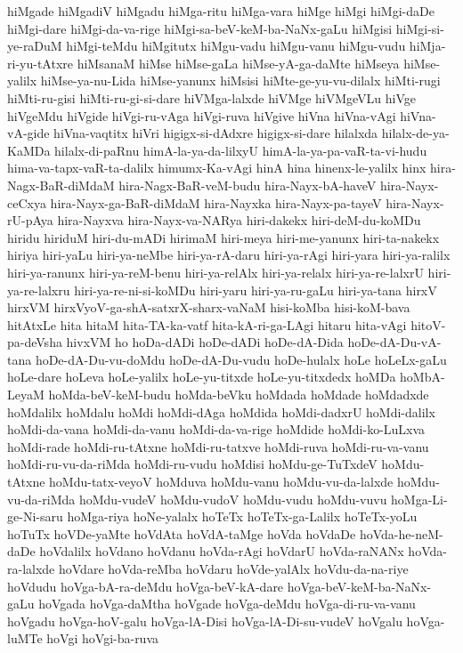 {hiMgade
hiMgadiV
hiMgadu
hiMga-ritu
hiMga-vara
hiMge
hiMgi
hiMgi-daDe
hiMgi-dare
hiMgi-da-va-rige
hiMgi-sa-beV-keM-ba-NaNx-gaLu
hiMgisi
hiMgi-si-ye-raDuM
hiMgi-teMdu
hiMgitutx
hiMgu-vadu
hiMgu-vanu
hiMgu-vudu
hiMja-ri-yu-tAtxre
hiMsanaM
hiMse
hiMse-gaLa
hiMse-yA-ga-daMte
hiMseya
hiMse-yalilx
hiMse-ya-nu-Lida
hiMse-yanunx
hiMsisi
hiMte-ge-yu-vu-dilalx
hiMti-rugi
hiMti-ru-gisi
hiMti-ru-gi-si-dare
hiVMga-lalxde
hiVMge
hiVMgeVLu
hiVge
hiVgeMdu
hiVgide
hiVgi-ru-vAga
hiVgi-ruva
hiVgive
hiVna
hiVna-vAgi
hiVna-vA-gide
hiVna-vaqtitx
hiVri
higigx-si-dAdxre
higigx-si-dare
hilalxda
hilalx-de-ya-KaMDa
hilalx-di-paRnu
himA-la-ya-da-lilxyU
himA-la-ya-pa-vaR-ta-vi-hudu
hima-va-tapx-vaR-ta-dalilx
himumx-Ka-vAgi
hinA
hina
hinenx-le-yalilx
hinx
hira-Nagx-BaR-diMdaM
hira-Nagx-BaR-veM-budu
hira-Nayx-bA-haveV
hira-Nayx-ceCxya
hira-Nayx-ga-BaR-diMdaM
hira-Nayxka
hira-Nayx-pa-tayeV
hira-Nayx-rU-pAya
hira-Nayxva
hira-Nayx-va-NARya
hiri-dakekx
hiri-deM-du-koMDu
hiridu
hiriduM
hiri-du-mADi
hirimaM
hiri-meya
hiri-me-yanunx
hiri-ta-nakekx
hiriya
hiri-yaLu
hiri-ya-neMbe
hiri-ya-rA-daru
hiri-ya-rAgi
hiri-yara
hiri-ya-ralilx
hiri-ya-ranunx
hiri-ya-reM-benu
hiri-ya-relAlx
hiri-ya-relalx
hiri-ya-re-lalxrU
hiri-ya-re-lalxru
hiri-ya-re-ni-si-koMDu
hiri-yaru
hiri-ya-ru-gaLu
hiri-ya-tana
hirxV
hirxVM
hirxVyoV-ga-shA-satxrX-sharx-vaNaM
hisi-koMba
hisi-koM-bava
hitAtxLe
hita
hitaM
hita-TA-ka-vatf
hita-kA-ri-ga-LAgi
hitaru
hita-vAgi
hitoV-pa-deVsha
hivxVM
ho
hoDa-dADi
hoDe-dADi
hoDe-dA-Dida
hoDe-dA-Du-vA-tana
hoDe-dA-Du-vu-doMdu
hoDe-dA-Du-vudu
hoDe-hulalx
hoLe
hoLeLx-gaLu
hoLe-dare
hoLeva
hoLe-yalilx
hoLe-yu-titxde
hoLe-yu-titxdedx
hoMDa
hoMbA-LeyaM
hoMda-beV-keM-budu
hoMda-beVku
hoMdada
hoMdade
hoMdadxde
hoMdalilx
hoMdalu
hoMdi
hoMdi-dAga
hoMdida
hoMdi-dadxrU
hoMdi-dalilx
hoMdi-da-vana
hoMdi-da-vanu
hoMdi-da-va-rige
hoMdide
hoMdi-ko-LuLxva
hoMdi-rade
hoMdi-ru-tAtxne
hoMdi-ru-tatxve
hoMdi-ruva
hoMdi-ru-va-vanu
hoMdi-ru-vu-da-riMda
hoMdi-ru-vudu
hoMdisi
hoMdu-ge-TuTxdeV
hoMdu-tAtxne
hoMdu-tatx-veyoV
hoMduva
hoMdu-vanu
hoMdu-vu-da-lalxde
hoMdu-vu-da-riMda
hoMdu-vudeV
hoMdu-vudoV
hoMdu-vudu
hoMdu-vuvu
hoMga-Li-ge-Ni-saru
hoMga-riya
hoNe-yalalx
hoTeTx
hoTeTx-ga-Lalilx
hoTeTx-yoLu
hoTuTx
hoVDe-yaMte
hoVdAta
hoVdA-taMge
hoVda
hoVdaDe
hoVda-he-neM-daDe
hoVdalilx
hoVdano
hoVdanu
hoVda-rAgi
hoVdarU
hoVda-raNANx
hoVda-ra-lalxde
hoVdare
hoVda-reMba
hoVdaru
hoVde-yalAlx
hoVdu-da-na-riye
hoVdudu
hoVga-bA-ra-deMdu
hoVga-beV-kA-dare
hoVga-beV-keM-ba-NaNx-gaLu
hoVgada
hoVga-daMtha
hoVgade
hoVga-deMdu
hoVga-di-ru-va-vanu
hoVgadu
hoVga-hoV-galu
hoVga-lA-Disi
hoVga-lA-Di-su-vudeV
hoVgalu
hoVga-luMTe
hoVgi
hoVgi-ba-ruva
}
